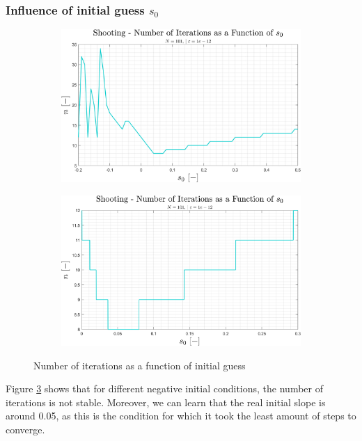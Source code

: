 \documentclass[11pt, a4paper]{article}
\begin{document}
\subsubsection{Influence of initial guess $s_0$}
\begin{figure}[H]
    \centering
    \begin{subfigure}[c]{0.49\textwidth}
        \centering
        \includegraphics[width=\textwidth]{images/shooting - n vs s0 - with negative.png}
        \caption{}
        \label{fig: shooting - n vs s0 - with negative}
    \end{subfigure}
    \hfill
    \begin{subfigure}[c]{0.49\textwidth}
        \centering
        \includegraphics[width=\textwidth]{images/shooting - n vs s0 - no negative.png}
        \caption{}
        \label{fig: shooting - n vs s0 - no negative}
    \end{subfigure}
    \caption{Number of iterations as a function of initial guess}
    \label{fig: shooting - Influence of s0}
\end{figure}
Figure \ref{fig: shooting - Influence of s0} shows that for different negative initial conditions, the number of iterations is not stable. Moreover, we can learn that the real initial slope is around 0.05, as this is the condition for which it took the least amount of steps to converge.
\end{document}
